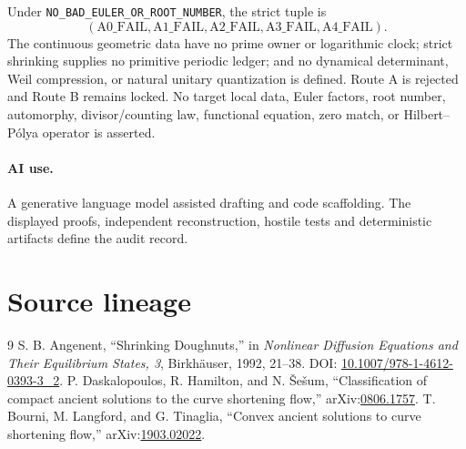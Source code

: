 \documentclass[10pt]{article}
\begin{document}
Under \texttt{NO\_BAD\_EULER\_OR\_ROOT\_NUMBER}, the strict tuple is
\[
 (\mathrm{A0\_FAIL},\mathrm{A1\_FAIL},\mathrm{A2\_FAIL},
  \mathrm{A3\_FAIL},\mathrm{A4\_FAIL}).
\]
The continuous geometric data have no prime owner or logarithmic clock;
strict shrinking supplies no primitive periodic ledger; and no dynamical
determinant, Weil compression, or natural unitary quantization is defined.
Route A is rejected and Route B remains locked.  No target local data,
Euler factors, root number, automorphy, divisor/counting law, functional
equation, zero match, or Hilbert--P\'olya operator is asserted.

\paragraph{AI use.} A generative language model assisted drafting and code
scaffolding.  The displayed proofs, independent reconstruction, hostile
tests and deterministic artifacts define the audit record.
\fi

\section*{Source lineage}
\begin{thebibliography}{9}
 S. B. Angenent, ``Shrinking Doughnuts,'' in
\emph{Nonlinear Diffusion Equations and Their Equilibrium States, 3},
Birkh\"auser, 1992, 21--38.
DOI: \href{https://doi.org/10.1007/978-1-4612-0393-3_2}{10.1007/978-1-4612-0393-3\_2}.
 P. Daskalopoulos, R. Hamilton, and N. \v{S}e\v{s}um,
``Classification of compact ancient solutions to the curve shortening
flow,'' arXiv:\href{https://arxiv.org/abs/0806.1757}{0806.1757}.
 T. Bourni, M. Langford, and G. Tinaglia,
``Convex ancient solutions to curve shortening flow,''
arXiv:\href{https://arxiv.org/abs/1903.02022}{1903.02022}.
\end{thebibliography}
\end{document}
